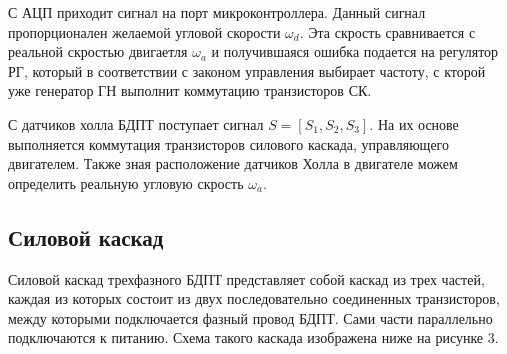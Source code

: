 \documentclass[russian, utf8]{eskdtext}
\begin{document}
С АЦП приходит сигнал на порт микроконтроллера. Данный сигнал пропорционален желаемой угловой скорости $\omega_d$. Эта скрость сравнивается с реальной скростью двигаетля $\omega_a$ и получившаяся ошибка подается на регулятор РГ, который в соответствии с законом управления выбирает частоту, с кторой уже генератор ГН выполнит коммутацию транзисторов СК. \par

С датчиков холла БДПТ поступает сигнал $S = [S_1, S_2, S_3]$. На их основе выполняется коммутация транзисторов силового каскада, управляющего двигателем. Также зная расположение датчиков Холла в двигателе можем определить реальную угловую скрость $\omega_a$.

\subsection{Силовой каскад}

Силовой каскад трехфазного БДПТ представляет собой каскад из трех частей, каждая из которых состоит из двух последовательно соединенных транзисторов, между которыми подключается фазный провод БДПТ. Сами части параллельно подключаются к питанию. Схема такого каскада изображена ниже на рисунке 3.

\newpage
\end{document}

